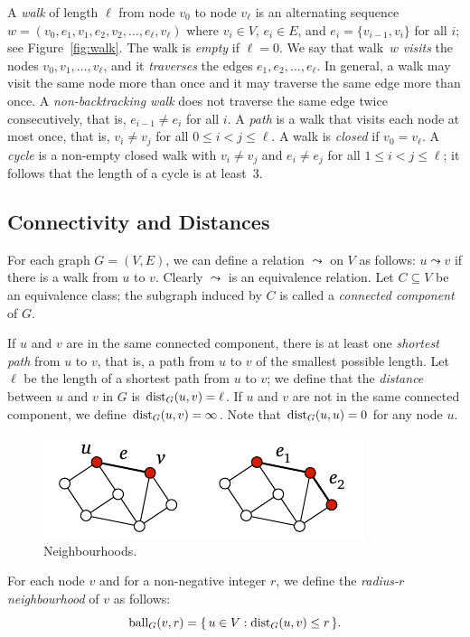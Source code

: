 A \emph{walk} of length $\ell$ from node $v_0$ to node $v_\ell$ is an alternating sequence $w = (v_0, e_1, v_1, e_2, v_2, \dotsc, e_\ell, v_\ell)$ where $v_i \in V$, $e_i \in E$, and $e_i = \{ v_{i-1}, v_i \}$ for all $i$; see Figure~\ref{fig:walk}. The walk is \emph{empty} if $\ell = 0$. We say that walk~$w$ \emph{visits} the nodes $v_0, v_1, \dotsc, v_\ell$, and it \emph{traverses} the edges $e_1, e_2, \dotsc, e_\ell$. In general, a walk may visit the same node more than once and it may traverse the same edge more than once. A \emph{non-backtracking walk} does not traverse the same edge twice consecutively, that is, $e_{i-1} \ne e_i$ for all $i$. A \emph{path} is a walk that visits each node at most once, that is, $v_i \ne v_j$ for all $0 \le i < j \le \ell$. A walk is \emph{closed} if $v_0 = v_\ell$. A \emph{cycle} is a non-empty closed walk with $v_i \ne v_j$ and $e_i \ne e_j$ for all $1 \le i < j \le \ell$; it follows that the length of a cycle is at least~$3$.


\subsection{Connectivity and Distances}

For each graph $G = (V,E)$, we can define a relation $\leadsto$ on $V$ as follows: $u \leadsto v$ if there is a walk from $u$ to $v$. Clearly $\leadsto$ is an equivalence relation. Let $C \subseteq V$ be an equivalence class; the subgraph induced by $C$ is called a \emph{connected component} of $G$.

If $u$ and $v$ are in the same connected component, there is at least one \emph{shortest path} from $u$ to $v$, that is, a path from $u$ to $v$ of the smallest possible length. Let $\ell$ be the length of a shortest path from $u$ to $v$; we define that the \emph{distance} between $u$ and $v$ in $G$ is $\operatorname{dist}_G(u,v) = \ell$. If $u$ and $v$ are not in the same connected component, we define $\operatorname{dist}_G(u,v) = \infty$. Note that $\operatorname{dist}_G(u,u) = 0$ for any node $u$.

\begin{figure}
    \centering
    \includegraphics[page=\PNeighbourhood]{figs.pdf}
    \caption{Neighbourhoods.}\label{fig:neighbourhood}
\end{figure}
For each node $v$ and for a non-negative integer $r$, we define the \emph{radius-$r$ neighbourhood} of $v$ as follows:
\[
    \operatorname{ball}_G(v, r) = \{\,  u \in V : \operatorname{dist}_G(u,v) \le r  \,\}.
\]

